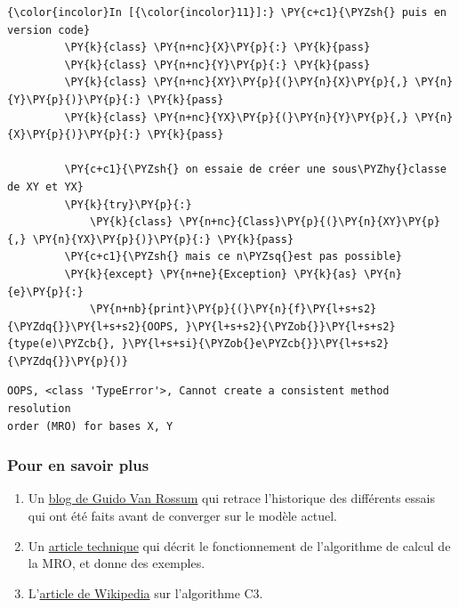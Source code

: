     \begin{Verbatim}[commandchars=\\\{\}]
{\color{incolor}In [{\color{incolor}11}]:} \PY{c+c1}{\PYZsh{} puis en version code}
         \PY{k}{class} \PY{n+nc}{X}\PY{p}{:} \PY{k}{pass}
         \PY{k}{class} \PY{n+nc}{Y}\PY{p}{:} \PY{k}{pass}
         \PY{k}{class} \PY{n+nc}{XY}\PY{p}{(}\PY{n}{X}\PY{p}{,} \PY{n}{Y}\PY{p}{)}\PY{p}{:} \PY{k}{pass}
         \PY{k}{class} \PY{n+nc}{YX}\PY{p}{(}\PY{n}{Y}\PY{p}{,} \PY{n}{X}\PY{p}{)}\PY{p}{:} \PY{k}{pass}
         
         \PY{c+c1}{\PYZsh{} on essaie de créer une sous\PYZhy{}classe de XY et YX}
         \PY{k}{try}\PY{p}{:}
             \PY{k}{class} \PY{n+nc}{Class}\PY{p}{(}\PY{n}{XY}\PY{p}{,} \PY{n}{YX}\PY{p}{)}\PY{p}{:} \PY{k}{pass} 
         \PY{c+c1}{\PYZsh{} mais ce n\PYZsq{}est pas possible}
         \PY{k}{except} \PY{n+ne}{Exception} \PY{k}{as} \PY{n}{e}\PY{p}{:}
             \PY{n+nb}{print}\PY{p}{(}\PY{n}{f}\PY{l+s+s2}{\PYZdq{}}\PY{l+s+s2}{OOPS, }\PY{l+s+s2}{\PYZob{}}\PY{l+s+s2}{type(e)\PYZcb{}, }\PY{l+s+si}{\PYZob{}e\PYZcb{}}\PY{l+s+s2}{\PYZdq{}}\PY{p}{)}
\end{Verbatim}


    \begin{Verbatim}[commandchars=\\\{\}]
OOPS, <class 'TypeError'>, Cannot create a consistent method resolution
order (MRO) for bases X, Y

    \end{Verbatim}

    \hypertarget{pour-en-savoir-plus}{%
\subsubsection{Pour en savoir plus}\label{pour-en-savoir-plus}}

    \begin{enumerate}
\def\labelenumi{\arabic{enumi}.}
\setcounter{enumi}{-1}
\tightlist
\item
  Un
  \href{http://python-history.blogspot.fr/2010/06/method-resolution-order.html}{blog
  de Guido Van Rossum} qui retrace l'historique des différents essais
  qui ont été faits avant de converger sur le modèle actuel.
\item
  Un \href{https://www.python.org/download/releases/2.3/mro/}{article
  technique} qui décrit le fonctionnement de l'algorithme de calcul de
  la MRO, et donne des exemples.
\item
  L'\href{http://en.wikipedia.org/wiki/C3_linearization}{article de
  Wikipedia} sur l'algorithme C3.
\end{enumerate}